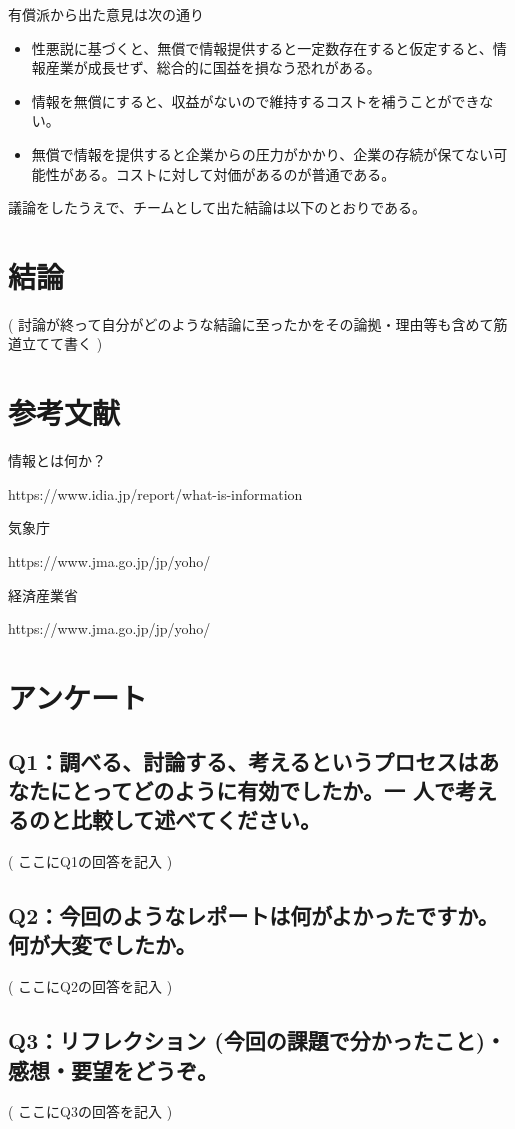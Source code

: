 \documentclass[12pt,a4j]{jarticle}
\begin{document}
有償派から出た意見は次の通り

\begin{itemize}
\item 性悪説に基づくと、無償で情報提供すると一定数存在すると仮定すると、情報産業が成長せず、総合的に国益を損なう恐れがある。
\item 情報を無償にすると、収益がないので維持するコストを補うことができない。
\item 無償で情報を提供すると企業からの圧力がかかり、企業の存続が保てない可能性がある。コストに対して対価があるのが普通である。
\end{itemize}

議論をしたうえで、チームとして出た結論は以下のとおりである。

\section{結論}
( 討論が終って自分がどのような結論に至ったかをその論拠・理由等も含めて筋道立てて書く )

\section{参考文献}

情報とは何か？

https://www.idia.jp/report/what-is-information

気象庁

https://www.jma.go.jp/jp/yoho/

経済産業省

https://www.jma.go.jp/jp/yoho/

\section{アンケート}

\subsection{Q1：調べる、討論する、考えるというプロセスはあなたにとってどのように有効でしたか。一 人で考えるのと比較して述べてください。}
( ここにQ1の回答を記入 )

\subsection{Q2：今回のようなレポートは何がよかったですか。何が大変でしたか。}
( ここにQ2の回答を記入 )

\subsection{Q3：リフレクション (今回の課題で分かったこと)・感想・要望をどうぞ。}
( ここにQ3の回答を記入 )
\end{document}
